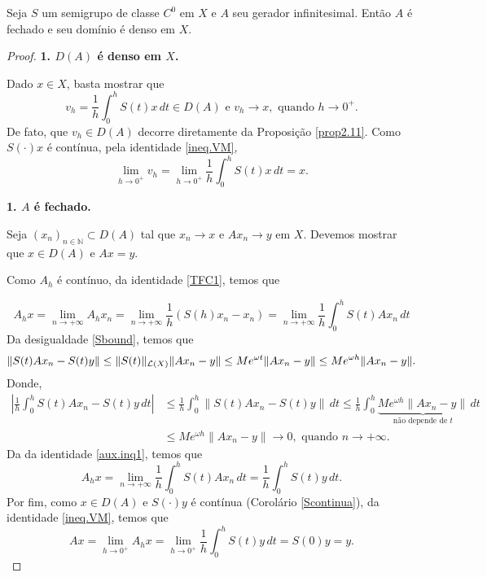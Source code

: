 \begin{proposition}\label{Afd}
Seja $S$ um semigrupo de classe $C^0$ em $X$ e $A$ seu gerador infinitesimal. Então $A$ é fechado e seu domínio é denso em $X$.
\end{proposition}
\begin{proof}
\noindent

\noindent\textbf{1. $D(A)$ é denso em $X$.}

Dado $x\in X$, basta mostrar que 
\[v_h=\frac{1}{h}\int_0^h S(t)x\,dt\in D(A) \text{ e } v_h\to x, \text{ quando } h\to 0^+.\]
De fato, que $v_h\in D(A)$ decorre diretamente da Proposição \ref{prop2.11}. Como $S(\cdot)x$ é contínua, pela identidade \eqref{ineq.VM}, 
\[\lim\limits_{h\to 0^+} v_h=\lim\limits_{h\to 0^+}\frac{1}{h}\int_0^h S(t)x\,dt=x.\]

\noindent\textbf{1. $A$ é fechado.}

Seja $(x_n)_{n\in \mathbb{N}}\subset D(A)$ tal que $x_n\to x$ e $Ax_n\to y$ 
em  $X$. Devemos mostrar que $x\in D(A)$ e $Ax=y$.



Como $A_h$ é contínuo, da identidade \eqref{TFC1}, temos que

\begin{equation}\label{aux.inq1}
A_hx =\lim\limits_{n\to +\infty}A_hx_n
=\lim\limits_{n\to +\infty}\frac{1}{h}\left(S(h)x_n-x_n\right)  =\lim\limits_{n\to +\infty}\frac{1}{h}\int_0^h S(t)Ax_n\,dt
\end{equation}
Da desigualdade \eqref{Sbound}, temos que
\begin{equation*}
\|S(t)Ax_n-S(t)y\|\leq \|S(t)\|_{\mathcal{L}(X)}\|Ax_n-y\|\leq Me^{\omega t} \|Ax_n-y\|\leq Me^{\omega h}\|Ax_n-y\|.
\end{equation*}
Donde, 
\begin{align*}
\left|\frac{1}{h}\int_0^h S(t)Ax_n-S(t)y\,dt\right|& \leq 
\frac{1}{h}\int_0^h\|S(t)Ax_n-S(t)y\|\,dt  \leq \frac{1}{h}\int_0^h \underbrace{Me^{\omega h}\|Ax_n-y\|}_{\text{não depende de $t$}}\,dt \\
& \leq Me^{\omega h}\|Ax_n-y\|\to 0, \text{ quando } n\to +\infty. 
\end{align*}
Da da identidade \eqref{aux.inq1}, temos que
\begin{equation*}
A_hx=\lim\limits_{n\to +\infty}\frac{1}{h}\int_0^h S(t)Ax_n\,dt=
\frac{1}{h}\int_0^h S(t)y\,dt.
\end{equation*}
Por fim, como $x\in D(A)$ e $S(\cdot)y$ é contínua (Corolário \ref*{Scontinua}), da identidade \eqref{ineq.VM}, temos que
\[
Ax=\lim_{h \to 0^+} A_hx=\lim_{h \to 0^+} \frac{1}{h}\int_0^h S(t)y\,dt=S(0)y=y.
\]
\end{proof}

